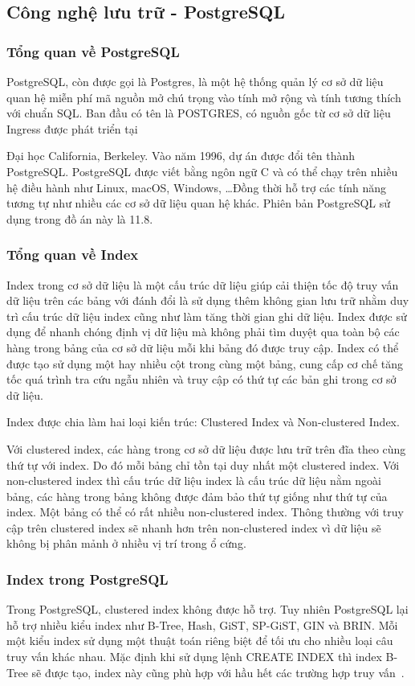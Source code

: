 \subsection{Công nghệ lưu trữ - PostgreSQL}

\subsubsection{Tổng quan về PostgreSQL}
PostgreSQL, còn được gọi là Postgres, là một hệ thống quản lý cơ sở 
dữ liệu quan hệ miễn phí mã nguồn mở chú trọng vào tính mở rộng và 
tính tương thích với chuẩn SQL. Ban đầu có tên là POSTGRES, có nguồn
gốc từ cơ sở dữ liệu Ingress được phát triển tại

Đại học California, Berkeley. Vào năm 1996, dự án được đổi tên thành
PostgreSQL. PostgreSQL được viết bằng ngôn ngữ C và có thể chạy trên nhiều
hệ điều hành như Linux, macOS, Windows, \ldots Đồng thời hỗ trợ các tính
năng tương tự như nhiều các cơ sở dữ liệu quan hệ khác.
Phiên bản PostgreSQL sử dụng trong đồ án này là 11.8.

\subsubsection{Tổng quan về Index}
Index trong cơ sở dữ liệu là một cấu trúc dữ liệu giúp cải thiện
tốc độ truy vấn dữ liệu trên các bảng với đánh đổi là sử dụng thêm
không gian lưu trữ nhằm duy trì cấu trúc dữ liệu index cũng như
làm tăng thời gian ghi dữ liệu. Index được sử dụng để nhanh chóng
định vị dữ liệu mà không phải tìm duyệt qua toàn bộ các hàng trong
bảng của cơ sở dữ liệu mỗi khi bảng đó được truy cập. Index có thể
được tạo sử dụng một hay nhiều cột trong cùng một bảng, cung cấp
cơ chế tăng tốc quá trình tra cứu ngẫu nhiên và truy cập có thứ
tự các bản ghi trong cơ sở dữ liệu. 

Index được chia làm hai loại kiến trúc:
Clustered Index và Non-clustered Index.

Với clustered index, các hàng trong cơ sở dữ liệu được lưu trữ
trên đĩa theo cùng thứ tự với index. Do đó mỗi bảng chỉ tồn tại
duy nhất một clustered index. Với non-clustered index thì cấu trúc dữ
liệu index là cấu trúc dữ liệu nằm ngoài bảng, các hàng trong bảng
không được đảm bảo thứ tự giống như thứ tự của index. Một bảng có
thể có rất nhiều non-clustered index. Thông thường với truy cập trên
clustered index sẽ nhanh hơn trên non-clustered index vì dữ liệu
sẽ không bị phân mảnh ở nhiều vị trí trong ổ cứng.

\subsubsection{Index trong PostgreSQL}
Trong PostgreSQL, clustered index không được hỗ trợ. Tuy nhiên
PostgreSQL lại hỗ trợ nhiều kiểu index như B-Tree, Hash, GiST,
SP-GiST, GIN và BRIN. Mỗi một kiểu index sử dụng một thuật toán
riêng biệt để tối ưu cho nhiều loại câu truy vấn khác nhau.
Mặc định khi sử dụng lệnh CREATE INDEX thì index B-Tree sẽ được tạo,
index này cũng phù hợp với hầu hết các
trường hợp truy vấn~\cite{postgresdocs}.

